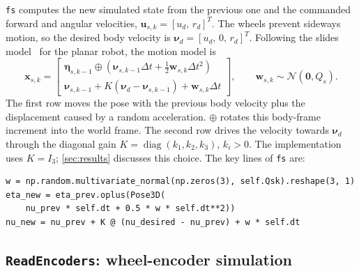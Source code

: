 \documentclass[letterpaper,12pt]{article}
\newcommand{\opluspose}{\mathbin{\oplus}}
\begin{document}
\texttt{fs} computes the new simulated state from the previous one and the
commanded forward and angular velocities, $\boldsymbol{u}_{s,k}=[u_d,\,r_d]^{T}$.
The wheels prevent sideways motion, so the desired body velocity is
$\boldsymbol{\nu}_d=[u_d,\,0,\,r_d]^{T}$. Following the slides
model~\cite[p.~33]{slidesIntro} for the planar robot, the motion model is
\begin{equation}
    \boldsymbol{x}_{s,k}=
    \begin{bmatrix}
        \boldsymbol{\eta}_{s,k-1}\opluspose\left(\boldsymbol{\nu}_{s,k-1}\Delta t
        +\tfrac{1}{2}\boldsymbol{w}_{s,k}\Delta t^{2}\right)\\
        \boldsymbol{\nu}_{s,k-1}+K(\boldsymbol{\nu}_d-\boldsymbol{\nu}_{s,k-1})
        +\boldsymbol{w}_{s,k}\Delta t
    \end{bmatrix},
    \qquad \boldsymbol{w}_{s,k}\sim\mathcal{N}(\boldsymbol{0},Q_s).
    \label{eq:fs}
\end{equation}
The first row moves the pose with the previous body velocity plus the
displacement caused by a random acceleration. $\oplus$ rotates this
body-frame increment into the world frame. The second row drives the velocity
towards $\boldsymbol{\nu}_d$ through the diagonal gain
$K=\operatorname{diag}(k_1,k_2,k_3)$, $k_i>0$. The implementation uses
$K=I_3$; \cref{sec:results} discusses this choice. The key lines of \texttt{fs} are:
\begin{lstlisting}[caption={Pose and velocity update in the simulator.}]
w = np.random.multivariate_normal(np.zeros(3), self.Qsk).reshape(3, 1)
eta_new = eta_prev.oplus(Pose3D(
    nu_prev * self.dt + 0.5 * w * self.dt**2))
nu_new = nu_prev + K @ (nu_desired - nu_prev) + w * self.dt
\end{lstlisting}


\subsection{\texttt{ReadEncoders}: wheel-encoder simulation}
\end{document}
